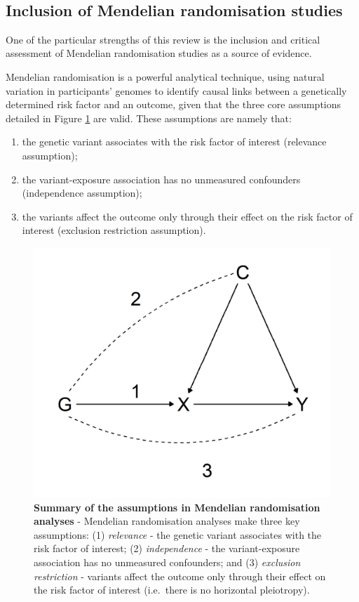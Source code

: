 \documentclass[a4paper, twoside]{templates/ociamthesis}
\providecommand{\tightlist}{%
  \setlength{\itemsep}{0pt}\setlength{\parskip}{0pt}}
\begin{document}
~

\hypertarget{rev-discussion-MR}{%
\subsection{Inclusion of Mendelian randomisation studies}\label{rev-discussion-MR}}

One of the particular strengths of this review is the inclusion and critical assessment of Mendelian randomisation studies as a source of evidence.

Mendelian randomisation is a powerful analytical technique, using natural variation in participants' genomes to identify causal links between a genetically determined risk factor and an outcome, given that the three core assumptions detailed in Figure \ref{fig:mrAssumptions} are valid. These assumptions are namely that:

\begin{enumerate}
\def\labelenumi{\arabic{enumi}.}
\tightlist
\item
  the genetic variant associates with the risk factor of interest (relevance assumption);
\item
  the variant-exposure association has no unmeasured confounders (independence assumption);
\item
  the variants affect the outcome only through their effect on the risk factor of interest (exclusion restriction assumption).
\end{enumerate}





\begin{figure}[H]

{\centering \includegraphics[width=0.7\linewidth]{figures/sys-rev/mrAssumptions} 

}

\caption[Summary of the assumptions in Mendelian randomisation analyses]{\textbf{Summary of the assumptions in Mendelian randomisation analyses} - Mendelian randomisation analyses make three key assumptions: (1) \emph{relevance} - the genetic variant associates with the risk factor of interest; (2) \emph{independence} - the variant-exposure association has no unmeasured confounders; and (3) \emph{exclusion restriction} - variants affect the outcome only through their effect on the risk factor of interest (i.e.~there is no horizontal pleiotropy).}\label{fig:mrAssumptions}
\end{figure}
\end{document}
